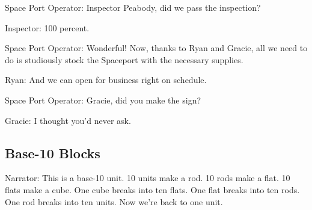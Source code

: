 Space Port Operator: Inspector Peabody, did we pass the inspection?

Inspector: 100 percent.

Space Port Operator: Wonderful! Now, thanks to Ryan and Gracie, all we need to do is studiously stock the Spaceport with the necessary supplies.

Ryan: And we can open for business right on schedule.

Space Port Operator: Gracie, did you make the sign?

Gracie: I thought you'd never ask.

\subsection{Base-10 Blocks}

Narrator: This is a base-10 unit. 10 units make a rod. 10 rods make a flat. 10 flats make a cube. One cube breaks into ten flats. One flat breaks into ten rods. One rod breaks into ten units. Now we're back to one unit.

